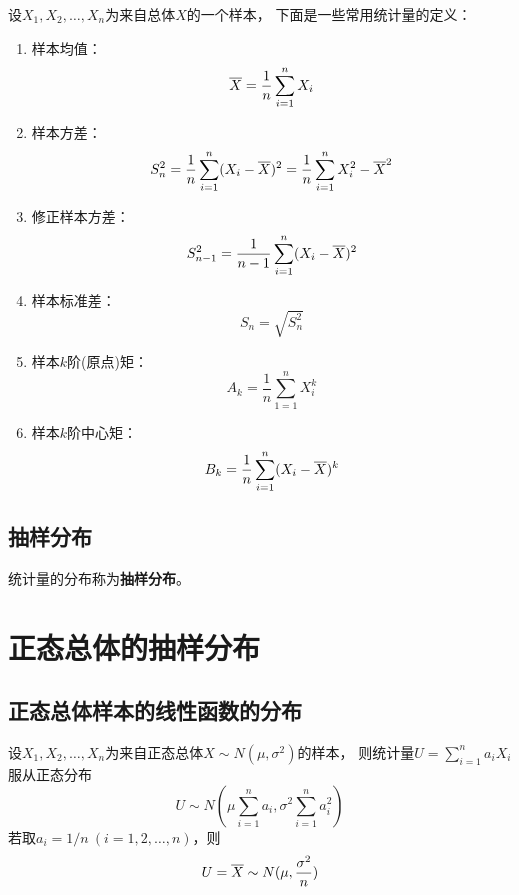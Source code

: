 \begin{definition}[常用统计量]
  设$X_1,X_2,\dots,X_n$为来自总体$X$的一个样本，
  下面是一些常用统计量的定义：
  \begin{enumerate}
    \item 样本均值：
    \begin{displaymath}
      \overline{X}=\frac{1}{n}\sum_{i=1}^{n}X_i
    \end{displaymath}
    \item 样本方差：
    \begin{displaymath}
      S_n^2 = \frac{1}{n}\sum_{i=1}^{n}(X_i-\overline{X})^2
      = \frac{1}{n}\sum_{i=1}^{n}X_i^2- \overline{X}^2
    \end{displaymath}
    \item 修正样本方差：
    \begin{displaymath}
      S_{n-1}^2 = \frac{1}{n-1}\sum_{i=1}^{n}(X_i-\overline{X})^2
    \end{displaymath}
    \item 样本标准差：
    \begin{displaymath}
      S_n = \sqrt{S_n^2}
    \end{displaymath}
    \item 样本$k$阶(原点)矩：
    \begin{displaymath}
      A_k = \frac{1}{n}\sum_{1=1}^{n}X_i^k
    \end{displaymath}
    \item 样本$k$阶中心矩：
    \begin{displaymath}
      B_k = \frac{1}{n}\sum_{i=1}^{n}(X_i-\overline{X})^k
    \end{displaymath}
  \end{enumerate}
\end{definition}

\subsection{抽样分布}
\begin{definition}[抽样分布]
  统计量的分布称为\textbf{抽样分布}。
\end{definition}

\section{正态总体的抽样分布}

\subsection{正态总体样本的线性函数的分布}
\begin{theorem}
  设$X_1,X_2,\dots,X_n$为来自正态总体$X\sim N(\mu,\sigma^2)$的样本，
  则统计量$U=\sum_{i=1}^{n}a_iX_i$服从正态分布
  \begin{displaymath}
    U\sim N\left(\mu\sum_{i=1}^{n}a_i,\sigma^2\sum_{i=1}^{n}a_i^2\right)
  \end{displaymath}
  若取$a_i=1/n\ (i=1,2,\dots,n)$，则
  \begin{displaymath}
    U = \overline{X} \sim N(\mu, \frac{\sigma^2}{n})
  \end{displaymath}
\end{theorem}

